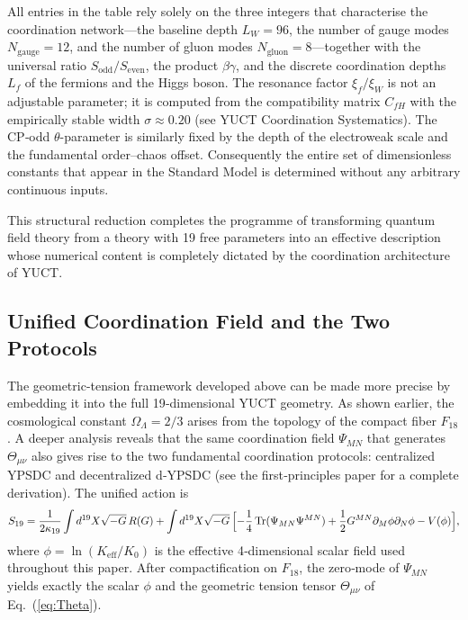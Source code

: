 \documentclass[12pt,a4paper]{article}
\DeclareMathOperator{\Tr}{Tr}
\begin{document}
	All entries in the table rely solely on the three integers that characterise the coordination
	network---the baseline depth \(L_W=96\), the number of gauge modes \(N_{\mathrm{gauge}}=12\), and
	the number of gluon modes \(N_{\mathrm{gluon}}=8\)---together with the universal ratio
	\(S_{\mathrm{odd}}/S_{\mathrm{even}}\), the product \(\beta\gamma\), and the discrete coordination
	depths \(L_f\) of the fermions and the Higgs boson.  The resonance factor \(\xi_f/\xi_W\) is not
	an adjustable parameter; it is computed from the compatibility matrix \(C_{fH}\) with the
	empirically stable width \(\sigma \approx 0.20\) (see YUCT Coordination Systematics).  The CP‑odd
	\(\theta\)-parameter is similarly fixed by the depth of the electroweak scale and the fundamental
	order–chaos offset.  Consequently the entire set of dimensionless constants that appear in the
	Standard Model is determined without any arbitrary continuous inputs.
	
	This structural reduction completes the programme of transforming quantum field theory from a
	theory with 19 free parameters into an effective description whose numerical content is
	completely dictated by the coordination architecture of YUCT.
	
	\subsection{Unified Coordination Field and the Two Protocols}
	\label{sec:unified-protocols}
	
	The geometric-tension framework developed above can be made more precise by
	embedding it into the full 19‑dimensional YUCT geometry. As shown earlier,
	the cosmological constant $\Omega_\Lambda=2/3$ arises from the topology of
	the compact fiber $F_{18}$. A deeper analysis reveals that the same
	coordination field $\Psi_{MN}$ that generates $\Theta_{\mu\nu}$ also gives
	rise to the two fundamental coordination protocols: centralized YPSDC and
	decentralized d‑YPSDC (see the first‑principles paper for a complete
	derivation). The unified action is
	\begin{equation}
		S_{19} = \frac{1}{2\kappa_{19}} \int d^{19}X \sqrt{-G}\, R(G)
		+ \int d^{19}X \sqrt{-G}\,
		\Bigl[ -\frac14 \Tr(\Psi_{MN}\Psi^{MN})
		+ \frac12 G^{MN}\partial_M\phi \partial_N\phi
		- V(\phi) \Bigr],
		\label{eq:unified-gravity}
	\end{equation}
	where $\phi = \ln(K_{\mathrm{eff}}/K_0)$ is the effective 4‑dimensional
	scalar field used throughout this paper. After compactification on $F_{18}$,
	the zero‑mode of $\Psi_{MN}$ yields exactly the scalar $\phi$ and the
	geometric tension tensor $\Theta_{\mu\nu}$ of Eq.~(\ref{eq:Theta}).
	
\end{document}
